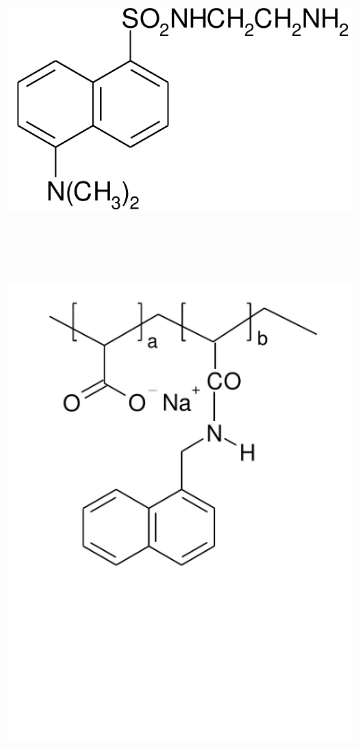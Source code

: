 \documentclass[journal=mamobx,manuscript=article]{achemso}
\begin{document}
\begin{figure}[H]
\begin{subfigure}[b]{0.35\textwidth}
        \caption{}
        \label{fig:C}
    \end{subfigure}
    \begin{subfigure}[b]{0.35\textwidth}
        \centering
        \includegraphics[scale=0.35]{realD.pdf}
        \caption{}
        \label{fig:D}
    \end{subfigure}\\\text{}\\
    \begin{subfigure}[b]{0.35\textwidth}
        \centering
        \includegraphics[scale=0.35]{E.pdf}

\end{subfigure}
\end{figure}
\end{document}
